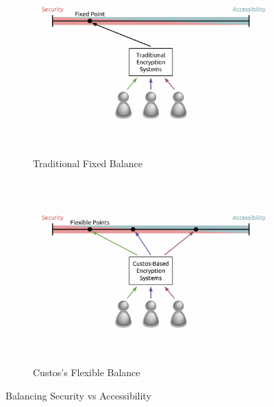 \begin{figure}[!tb]
  \vspace{5ex}
  \begin{center}
    \begin{subfigure}{\textwidth}
      \begin{center}
        \includegraphics[height=200pt]
                        {./figs/pdf/SecuityToAccessibility-Traditional.pdf}
        \caption{Traditional Fixed Balance}
        \label{fig:SvA-traditional}
      \end{center}
    \end{subfigure}
    \begin{subfigure}{\textwidth}
      \begin{center}
        \includegraphics[height=200pt]
                        {./figs/pdf/SecuityToAccessibility-Custos.pdf}
        \caption{Custos's Flexible Balance}
        \label{fig:SvA-custos}
      \end{center}
    \end{subfigure}
  \end{center}
  \caption{Balancing Security vs Accessibility}
  \label{fig:SvA}
\end{figure}

